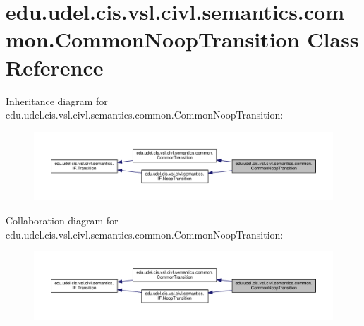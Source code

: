 \hypertarget{classedu_1_1udel_1_1cis_1_1vsl_1_1civl_1_1semantics_1_1common_1_1CommonNoopTransition}{}\section{edu.\+udel.\+cis.\+vsl.\+civl.\+semantics.\+common.\+Common\+Noop\+Transition Class Reference}
\label{classedu_1_1udel_1_1cis_1_1vsl_1_1civl_1_1semantics_1_1common_1_1CommonNoopTransition}


Inheritance diagram for edu.\+udel.\+cis.\+vsl.\+civl.\+semantics.\+common.\+Common\+Noop\+Transition\+:
\nopagebreak
\begin{figure}[H]
\begin{center}
\leavevmode
\includegraphics[width=350pt]{classedu_1_1udel_1_1cis_1_1vsl_1_1civl_1_1semantics_1_1common_1_1CommonNoopTransition__inherit__graph}
\end{center}
\end{figure}


Collaboration diagram for edu.\+udel.\+cis.\+vsl.\+civl.\+semantics.\+common.\+Common\+Noop\+Transition\+:
\nopagebreak
\begin{figure}[H]
\begin{center}
\leavevmode
\includegraphics[width=350pt]{classedu_1_1udel_1_1cis_1_1vsl_1_1civl_1_1semantics_1_1common_1_1CommonNoopTransition__coll__graph}
\end{center}
\end{figure}
